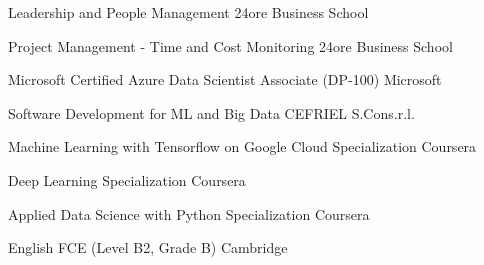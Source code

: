 

\begin{cvhonors}

  \cvhonor
    {Leadership and People Management } %
    {24ore Business School} %
    {} %
    {} %

  \cvhonor
    {Project Management - Time and Cost Monitoring} %
    {24ore Business School} %
    {} %
    {} %

  \cvhonor
    {Microsoft Certified Azure Data Scientist Associate (DP-100)} %
    {Microsoft} %
    {} %
    {} %

  \cvhonor
    {Software Development for ML and Big Data} %
    {CEFRIEL S.Cons.r.l.} %
    {} %
    {} %

  \cvhonor
    {Machine Learning with Tensorflow on Google Cloud Specialization} %
    {Coursera} %
    {} %
    {} %

  \cvhonor
    {Deep Learning Specialization} %
    {Coursera} %
    {} %
    {} %

  \cvhonor
    {Applied Data Science with Python Specialization} %
    {Coursera} %
    {} %
    {} %
    
  \cvhonor
    {English FCE (Level B2, Grade B)} %
    {Cambridge} %
    {} %
    {} %

\end{cvhonors}